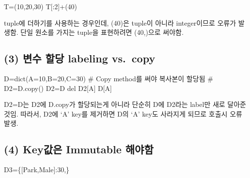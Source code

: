 \documentclass[
  a4paper,
  DIV=11,
  numbers=noendperiod]{scrreprt}
\newenvironment{Shaded}{\begin{snugshade}}{\end{snugshade}}
\newcommand{\BuiltInTok}[1]{\textcolor[rgb]{0.00,0.23,0.31}{#1}}
\newcommand{\CommentTok}[1]{\textcolor[rgb]{0.37,0.37,0.37}{#1}}
\newcommand{\DecValTok}[1]{\textcolor[rgb]{0.68,0.00,0.00}{#1}}
\newcommand{\KeywordTok}[1]{\textcolor[rgb]{0.00,0.23,0.31}{#1}}
\newcommand{\NormalTok}[1]{\textcolor[rgb]{0.00,0.23,0.31}{#1}}
\newcommand{\OperatorTok}[1]{\textcolor[rgb]{0.37,0.37,0.37}{#1}}
\newcommand{\StringTok}[1]{\textcolor[rgb]{0.13,0.47,0.30}{#1}}
\begin{document}
\begin{Shaded}
\begin{Highlighting}[]
\NormalTok{T}\OperatorTok{=}\NormalTok{(}\DecValTok{10}\NormalTok{,}\DecValTok{20}\NormalTok{,}\DecValTok{30}\NormalTok{)}
\NormalTok{T[:}\DecValTok{2}\NormalTok{]}\OperatorTok{+}\NormalTok{(}\DecValTok{40}\NormalTok{)}
\end{Highlighting}
\end{Shaded}

tuple에 더하기를 사용하는 경우인데, (40)은 tuple이 아니라 integer이므로
오류가 발생함. 단일 원소를 가지는 tuple을 표현하려면 (40,)으로 써야함.

\subsection*{(3) 변수 할당 labeling
vs.~copy}\label{uxbcc0uxc218-uxd560uxb2f9-labeling-vs.-copy}

\begin{Shaded}
\begin{Highlighting}[]
\NormalTok{D}\OperatorTok{=}\BuiltInTok{dict}\NormalTok{(A}\OperatorTok{=}\DecValTok{10}\NormalTok{,B}\OperatorTok{=}\DecValTok{20}\NormalTok{,C}\OperatorTok{=}\DecValTok{30}\NormalTok{)}
\CommentTok{\# Copy method를 써야 복사본이 할당됨}
\CommentTok{\# D2=D.copy()}
\NormalTok{D2}\OperatorTok{=}\NormalTok{D}
\KeywordTok{del}\NormalTok{ D2[}\StringTok{\textquotesingle{}A\textquotesingle{}}\NormalTok{]}
\NormalTok{D[}\StringTok{\textquotesingle{}A\textquotesingle{}}\NormalTok{]}
\end{Highlighting}
\end{Shaded}

D2=D는 D2에 D.copy가 할당되는게 아니라 단순히 D에 D2라는 label만 새로
달아준것임. 따라서, D2에 `A' key를 제거하면 D의 `A' key도 사라지게
되므로 호출시 오류 발생.

\subsection*{(4) Key값은 Immutable
해야함}\label{keyuxac12uxc740-immutable-uxd574uxc57cuxd568}

\begin{Shaded}
\begin{Highlighting}[]
\NormalTok{D3}\OperatorTok{=}\NormalTok{\{[}\StringTok{\textquotesingle{}Park\textquotesingle{}}\NormalTok{,}\StringTok{\textquotesingle{}Male\textquotesingle{}}\NormalTok{]:}\DecValTok{30}\NormalTok{,\}}
\end{Highlighting}
\end{Shaded}
\end{document}

